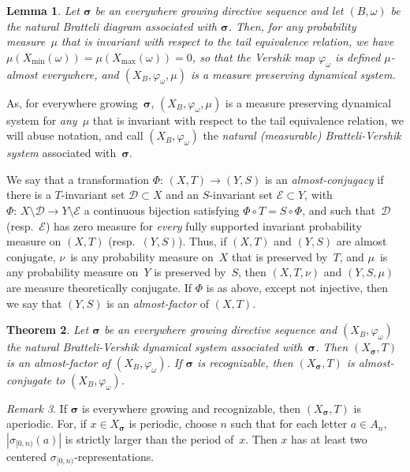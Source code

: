 \documentclass{amsart}
\newtheorem{lemma}{Lemma}[section]
\newtheorem{theorem}[lemma]{Theorem}
\theoremstyle{definition}
\theoremstyle{remark}
\newtheorem{remark}[lemma]{Remark}
\numberwithin{equation}{section}
\begin{document}
\begin{lemma}\label{small_base2}
Let $\boldsymbol{\sigma}$ be an  everywhere growing directive sequence and let  $(B,\omega)$ be the natural Bratteli  diagram associated  with $\boldsymbol{\sigma}$.
Then,   for any probability measure~$\mu$ that is invariant with respect to the tail equivalence relation, we have $\mu(X_{\min}(\omega)) =\mu(X_{\max}(\omega)) = 0$,  so
that  the Vershik map $\varphi_\omega$ is defined $\mu$-almost everywhere, and $ (X_B,\varphi_\omega, \mu)$   is a measure preserving  dynamical system.\end{lemma}

As, for everywhere growing~$\boldsymbol{\sigma}$, $(X_B,\varphi_\omega, \mu)$ is a measure preserving  dynamical system for \emph{any}~$\mu$ that is invariant with respect to the tail equivalence relation, we will abuse notation, and call $(X_B,\varphi_\omega)$ the \emph{natural (measurable) Bratteli-Vershik system} associated with~$\boldsymbol{\sigma}$.

We say that a transformation $\Phi:\, (X,T) \to (Y,S)$ is an \emph{almost-conjugacy} if there is a $T$-invariant set $\mathcal{D} \subset X$ and an $S$-invariant set $\mathcal{E} \subset Y$, with $\Phi:\, X \setminus \mathcal{D} \to Y \setminus \mathcal{E}$ a continuous bijection satisfying $\Phi \circ T= S \circ \Phi$, and such that~$\mathcal{D}$  (resp.~$\mathcal{E}$)     has zero measure for \emph{every} fully supported invariant probability measure on $(X,T)$ (resp.~$(Y,S)$).
Thus, if $(X,T)$ and $(Y,S)$ are almost conjugate, $\nu$~is any probability measure on~$X$ that is preserved by~$T$, and $\mu$~is any probability measure on~$Y$ is preserved by~$S$, then $(X,T,\nu)$ and $(Y,S,\mu)$ are measure theoretically conjugate.
If $\Phi$ is as above, except not injective, then we say that $(Y,S)$ is an \emph{almost-factor} of $(X,T)$.

\begin{theorem}\label{thm:Bratteli-Vershik}
Let $\boldsymbol{\sigma}$ be an everywhere growing directive sequence and $(X_B, \varphi_\omega)$ the natural Bratteli-Vershik dynamical system associated with~$\boldsymbol{\sigma}$. 
Then $(X_{\boldsymbol{\sigma}},T)$ is an almost-factor of $(X_B, \varphi_\omega)$. 
If $\boldsymbol{\sigma}$ is recognizable, then $(X_{\boldsymbol{\sigma}},T)$ is  almost-conjugate to $(X_B, \varphi_\omega)$.
\end{theorem}

\begin{remark}
If $\boldsymbol{\sigma}$ is everywhere growing and recognizable, then $(X_{\boldsymbol{\sigma}},T)$ is aperiodic. 
For, if $x\in X_{\boldsymbol{\sigma}}$ is periodic, choose $n$ such that for each letter $a\in A_n$,  $|\sigma_{[0,n)}(a)|$ is strictly larger than the period of~$x$. 
Then $x$ has at least two centered $\sigma_{[0,n)}$-representations.
\end{remark}
\end{document}
